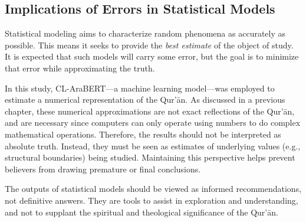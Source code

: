 \subsection{Implications of Errors in Statistical Models}

Statistical modeling aims to characterize random phenomena as accurately as possible. This means it seeks to provide the \emph{best estimate} of the object of study. It is expected that such models will carry some error, but the goal is to minimize that error while approximating the truth.

In this study, CL-AraBERT—a machine learning model—was employed to estimate a numerical representation of the Qur'\=an. As discussed in a previous chapter, these numerical approximations are not exact reflections of the Qur'\=an, and are necessary since computers can only operate using numbers to do complex mathematical operations. Therefore, the results should not be interpreted as absolute truth. Instead, they must be seen as estimates of underlying values (e.g., structural boundaries) being studied. Maintaining this perspective helps prevent believers from drawing premature or final conclusions.

The outputs of statistical models should be viewed as informed recommendations, not definitive answers. They are tools to assist in exploration and understanding, and not to supplant the spiritual and theological significance of the Qur'\=an.
